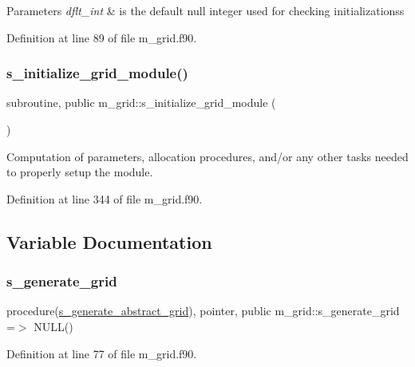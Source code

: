 \begin{DoxyParams}{Parameters}
{\em dflt\+\_\+int} & is the default null integer used for checking initializationss \\
\hline
\end{DoxyParams}


Definition at line 89 of file m\+\_\+grid.\+f90.

\mbox{\label{namespacem__grid_a08c7d18352873ceab95c10629c1ce317}} 
\subsubsection{\texorpdfstring{s\+\_\+initialize\+\_\+grid\+\_\+module()}{s\_initialize\_grid\_module()}}
{\footnotesize\ttfamily subroutine, public m\+\_\+grid\+::s\+\_\+initialize\+\_\+grid\+\_\+module (\begin{DoxyParamCaption}{ }\end{DoxyParamCaption})}



Computation of parameters, allocation procedures, and/or any other tasks needed to properly setup the module. 



Definition at line 344 of file m\+\_\+grid.\+f90.



\subsection{Variable Documentation}
\mbox{\label{namespacem__grid_a3af3e5a8e440ff542dfd274546fb8150}} 
\subsubsection{\texorpdfstring{s\+\_\+generate\+\_\+grid}{s\_generate\_grid}}
{\footnotesize\ttfamily procedure(\hyperlink{interfacem__grid_1_1s__generate__abstract__grid}{s\+\_\+generate\+\_\+abstract\+\_\+grid}), pointer, public m\+\_\+grid\+::s\+\_\+generate\+\_\+grid =$>$ N\+U\+LL()}



Definition at line 77 of file m\+\_\+grid.\+f90.

